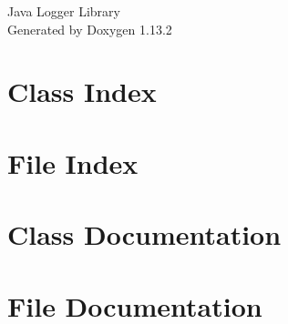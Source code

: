 \documentclass[twoside]{book}
\newcommand{\+}{\discretionary{\mbox{\scriptsize$\hookleftarrow$}}{}{}}
\newcommand{\clearemptydoublepage}{%
    \newpage{\pagestyle{empty}\cleardoublepage}%
  }
\begin{document}
  \raggedbottom
    \hypersetup{pageanchor=false,
                bookmarksnumbered=true,
                pdfencoding=unicode
               }
  \begin{titlepage}
  \vspace*{7cm}
  \begin{center}%
  {\Large Java Logger Library}\\
  \vspace*{1cm}
  {\large Generated by Doxygen 1.13.2}\\
  \end{center}
  \end{titlepage}
  \clearemptydoublepage
  \tableofcontents
  \clearemptydoublepage
  \hypersetup{pageanchor=true}
\chapter{Class Index}

\chapter{File Index}

\chapter{Class Documentation}

\chapter{File Documentation}


  \backmatter
  \newpage
  \clearemptydoublepage
  \printindex
\end{document}
